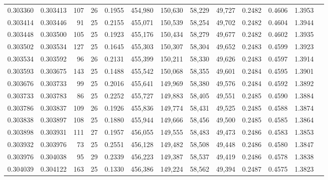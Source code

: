 \begin{tabular}{rrrrrrrrrrrrr}
0.303360 & 0.303413 &   107 &  26 &                                     0.1955 & 454,980 & 150,630 &  58,229 &  49,727 & 0.2482 & 0.4606 & 1.3953 \\
0.303414 & 0.303446 &    91 &  25 &                                     0.2155 & 455,071 & 150,539 &  58,254 &  49,702 & 0.2482 & 0.4604 & 1.3944 \\
0.303448 & 0.303500 &   105 &  25 &                                     0.1923 & 455,176 & 150,434 &  58,279 &  49,677 & 0.2482 & 0.4602 & 1.3935 \\
0.303502 & 0.303534 &   127 &  25 &                                     0.1645 & 455,303 & 150,307 &  58,304 &  49,652 & 0.2483 & 0.4599 & 1.3923 \\
0.303534 & 0.303592 &    96 &  26 &                                     0.2131 & 455,399 & 150,211 &  58,330 &  49,626 & 0.2483 & 0.4597 & 1.3914 \\
0.303593 & 0.303675 &   143 &  25 &                                     0.1488 & 455,542 & 150,068 &  58,355 &  49,601 & 0.2484 & 0.4595 & 1.3901 \\
0.303676 & 0.303733 &    99 &  25 &                                     0.2016 & 455,641 & 149,969 &  58,380 &  49,576 & 0.2484 & 0.4592 & 1.3892 \\
0.303733 & 0.303783 &    86 &  25 &                                     0.2252 & 455,727 & 149,883 &  58,405 &  49,551 & 0.2485 & 0.4590 & 1.3884 \\
0.303786 & 0.303837 &   109 &  26 &                                     0.1926 & 455,836 & 149,774 &  58,431 &  49,525 & 0.2485 & 0.4588 & 1.3874 \\
0.303838 & 0.303897 &   108 &  25 &                                     0.1880 & 455,944 & 149,666 &  58,456 &  49,500 & 0.2485 & 0.4585 & 1.3864 \\
0.303898 & 0.303931 &   111 &  27 &                                     0.1957 & 456,055 & 149,555 &  58,483 &  49,473 & 0.2486 & 0.4583 & 1.3853 \\
0.303932 & 0.303976 &    73 &  25 &                                     0.2551 & 456,128 & 149,482 &  58,508 &  49,448 & 0.2486 & 0.4580 & 1.3847 \\
0.303976 & 0.304038 &    95 &  29 &                                     0.2339 & 456,223 & 149,387 &  58,537 &  49,419 & 0.2486 & 0.4578 & 1.3838 \\
0.304039 & 0.304122 &   163 &  25 &                                     0.1330 & 456,386 & 149,224 &  58,562 &  49,394 & 0.2487 & 0.4575 & 1.3823 \\

\end{tabular}

